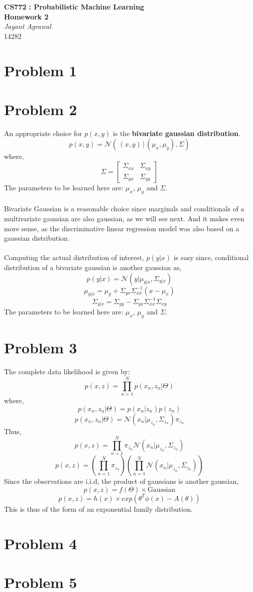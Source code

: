 \documentclass{article}
\begin{document}

\begin{center}
\textbf{\huge CS772 : Probabilistic Machine Learning} \\
\textbf{\huge Homework 2} \\
\vspace{5pt}
\textit{\Large Jayant Agrawal} \\
14282
\end{center}

\section*{Problem 1}
\section*{Problem 2}

An appropriate choice for $p(x,y)$ is the \textbf{bivariate gaussian distribution}.
$$p(x,y) = \mathcal{N}(\hspace{2pt} (x,y)\hspace{2pt} | \hspace{2pt} (\mu_x,\mu_y), \Sigma)$$
where,
\[
\Sigma=
  \begin{bmatrix}
    \Sigma_{xx} & \Sigma_{xy}  \\
    \Sigma_{yx} & \Sigma_{yy} 
  \end{bmatrix}
\]
The parameters to be learned here are: $\mu_x$, $\mu_y$ and $\Sigma$. \\ \\
Bivariate Gaussian is a reasonable choice since marginals and conditionals of a multivariate gaussian are also gaussian, as we will see next. And it makes even more sense, as the discriminative linear regression model was also based on a gaussian distribution. \\ \\
Computing the actual distribution of interest, $p(y|x)$ is easy since, conditional distribution of a bivariate gaussian is another gaussian as,
$$p(y|x) = \mathcal{N}(y|\mu_{y|x}, \Sigma_{y|x})$$
$$\mu_{y|x} = \mu_y + \Sigma_{yx}\Sigma_{xx}^{-1}(x-\mu_x)$$
$$\Sigma_{y|x} = \Sigma_{yy} - \Sigma_{yx}\Sigma_{xx}^{-1}\Sigma_{xy}$$
The parameters to be learned here are: $\mu_x$, $\mu_y$ and $\Sigma$.

\section*{Problem 3}
The complete data likelihood is given by:
$$p(x,z) = \prod_{n=1}^Np(x_n,z_n|\Theta)$$
where,
$$p(x_n, z_n|\Theta) = p(x_n|z_n)p(z_n)$$	
$$p(x_n, z_n|\Theta) = \mathcal{N}(x_n|\mu_{z_n}, \Sigma_{z_n})\pi_{z_n}$$	
Thus, 
$$p(x,z) = \prod_{n=1}^N\pi_{z_n}\mathcal{N}(x_n|\mu_{z_n}, \Sigma_{z_n})$$
$$p(x,z) = ( \prod_{n=1}^N\pi_{z_n})(\prod_{n=1}^{N}\mathcal{N}(x_n|\mu_{z_n}, \Sigma_{z_n}))$$
Since the observations are i.i.d, the product of gaussians is another gaussian, 
$$p(x,z) = f(\Theta) \times \text{Gaussian}$$
$$p(x,z) = h(x) \times exp(\theta^T \phi(x) - A(\theta))$$
This is thus of the form of an exponential family distribution.
\section*{Problem 4}
\section*{Problem 5}
\end{document}
